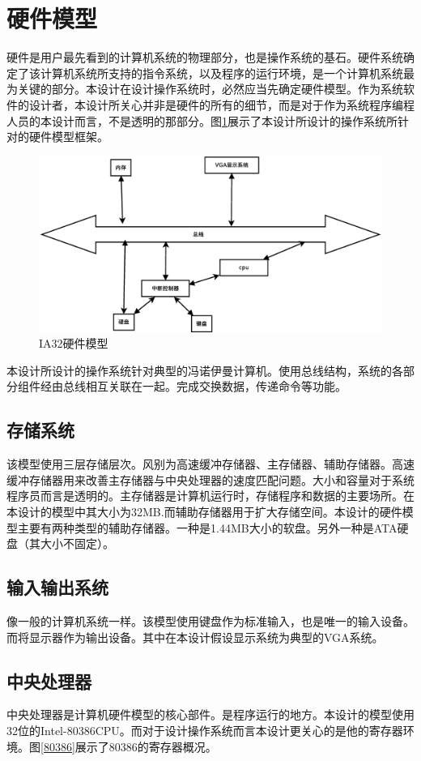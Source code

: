 \documentclass[UTF8,nofonts,cs4size]{ctexrep}
\begin{document}
\section{硬件模型}
硬件是用户最先看到的计算机系统的物理部分，也是操作系统的基石。硬件系统确定了该计算机系统所支持的指令系统，以及程序的运行环境，是一个计算机系统最为关键的部分。本设计在设计操作系统时，必然应当先确定硬件模型。作为系统软件的设计者，本设计所关心并非是硬件的所有的细节，而是对于作为系统程序编程人员的本设计而言，不是透明的那部分。图\ref{hard}展示了本设计所设计的操作系统所针对的硬件模型框架。
\begin{figure}[htp]
\centering
\includegraphics[scale=0.38]{sumti.eps}
\caption{IA32硬件模型}
\label{hard}
\end{figure}

本设计所设计的操作系统针对典型的冯诺伊曼计算机。使用总线结构，系统的各部分组件经由总线相互关联在一起。完成交换数据，传递命令等功能。
\subsection{存储系统}
该模型使用三层存储层次。风别为高速缓冲存储器、主存储器、辅助存储器。高速缓冲存储器用来改善主存储器与中央处理器的速度匹配问题。大小和容量对于系统程序员而言是透明的。主存储器是计算机运行时，存储程序和数据的主要场所。在本设计的模型中其大小为32MB.而辅助存储器用于扩大存储空间。本设计的硬件模型主要有两种类型的辅助存储器。一种是1.44MB大小的软盘。另外一种是ATA硬盘（其大小不固定）。                                                                                     
\subsection{输入输出系统}
像一般的计算机系统一样。该模型使用键盘作为标准输入，也是唯一的输入设备。而将显示器作为输出设备。其中在本设计假设显示系统为典型的VGA系统。
\subsection{中央处理器}
中央处理器是计算机硬件模型的核心部件。是程序运行的地方。本设计的模型使用32位的Intel-80386CPU。而对于设计操作系统而言本设计更关心的是他的寄存器环境。图\ref{80386}展示了80386的寄存器概况。
\end{document}
